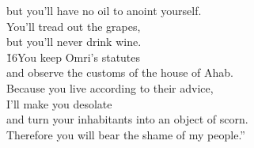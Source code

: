 \begin{poetry}
\poemll    but you'll have no oil to anoint yourself. \\
\poeml You'll tread out the grapes, \\
\poemll    but you'll never drink wine. \\
\poeml \v{16}You keep Omri's statutes \\
\poemll    and observe the customs of the house of Ahab. \\
\poeml Because you live according to their advice, \\
\poemll    I'll make you desolate \\
\poemlll       and turn your inhabitants into an object of scorn. \\
\poeml Therefore you will bear the shame of my people.''
\end{poetry}

